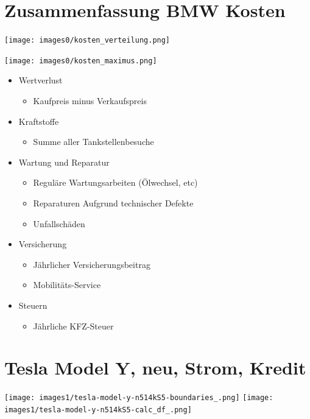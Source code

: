 \documentclass[landscape, DIV=99, 14pt]{scrartcl}
\begin{document}

\twocolumn
\section*{Zusammenfassung BMW Kosten}
\null
\vspace{1cm}
\begin{center}
\texttt{[image: images0/kosten\_verteilung.png]}
\end{center}

\texttt{[image: images0/kosten\_maximus.png]}

\pagebreak

\begin{itemize}
    \item Wertverlust
    \begin{itemize}
        \item Kaufpreis minus Verkaufspreis
    \end{itemize}
    \item Kraftstoffe
    \begin{itemize}
        \item Summe aller Tankstellenbesuche
    \end{itemize}
    \item Wartung und Reparatur
    \begin{itemize}
        \item Regul\"are Wartungsarbeiten (\"Olwechsel, etc)
        \item Reparaturen Aufgrund technischer Defekte
        \item Unfallsch\"aden
    \end{itemize}
    \item Versicherung
    \begin{itemize}
        \item J\"ahrlicher Versicherungsbeitrag
        \item Mobilit\"ats-Service
    \end{itemize}
    \item Steuern
    \begin{itemize}
            \item J\"ahrliche KFZ-Steuer
    \end{itemize}
\end{itemize}


\twocolumn

\section*{Tesla Model Y, neu, Strom, Kredit}
\begin{center}
\texttt{[image: images1/tesla-model-y-n514kS5-boundaries\_.png]}
\null
\vspace{0.5cm}
\texttt{[image: images1/tesla-model-y-n514kS5-calc\_df\_.png]}
\end{center}
\end{document}
